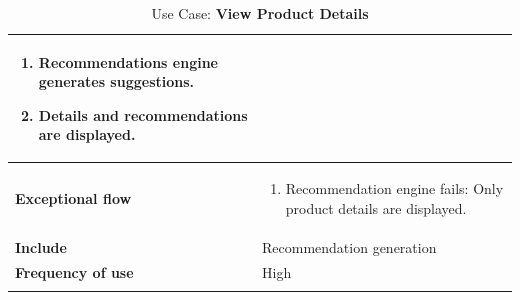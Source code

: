 \documentclass[12pt]{report}
\begin{document}
\begin{appendices}
\begin{longtable}[H]{|l|p{9cm}||}
\begin{enumerate}
			                                \item Recommendations engine generates suggestions.
			                                \item Details and recommendations are displayed.
		                                \end{enumerate}          \\
		\hline
		\textbf{Exceptional flow}     & \begin{enumerate}
			                                \item Recommendation engine fails: Only product details are displayed.
		                                \end{enumerate} \\
		\hline
		\textbf{Include}              & Recommendation generation                                             \\
		\hline
		\textbf{Frequency of use}     & High                                                                  \\
		\hline
		\hline
		\caption{Use Case: \textbf{View Product Details}}\label{tab:tableViewProduct}
	\end{longtable}


\end{appendices}
\end{document}
